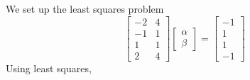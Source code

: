 \documentclass[]{article}
\begin{document}
\subsection{}

We set up the least squares problem
\begin{equation}
	\begin{bmatrix}
	-2 & 4 \\
	-1 & 1 \\
	1 & 1 \\
	2 & 4
	\end{bmatrix}
	\begin{bmatrix}
	\alpha \\
	\beta
	\end{bmatrix}
	=
	\begin{bmatrix}
	-1 \\
	1 \\
	1 \\
	-1
	\end{bmatrix}
\end{equation}
Using least squares,
\end{document}
